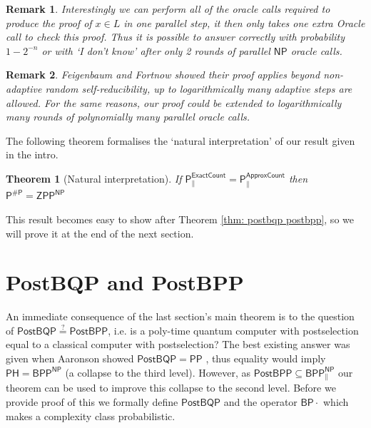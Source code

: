 \documentclass{article}
\newtheorem{theorem}{Theorem}
\newtheorem*{remark*}{Remark}
\begin{document}
\begin{remark*}
    Interestingly we can perform all of the oracle calls required to produce the proof of $x\in L$ in one parallel step, it then only takes one extra Oracle call to check this proof. Thus it is possible to answer correctly with probability $1-2^{-n}$ or with `I don't know' after only 2 rounds of parallel $\mathsf{NP}$ oracle calls.
\end{remark*}

\begin{remark*}
    Feigenbaum and Fortnow \cite{feigenbaum1990random} showed their proof applies beyond non-adaptive random self-reducibility, up to logarithmically many adaptive steps are allowed. For the same reasons, our proof could be extended to logarithmically many rounds of polynomially many parallel oracle calls.
\end{remark*}

The following theorem formalises the `natural interpretation' of our result given in the intro.

\begin{theorem}[Natural interpretation]\label{thm: natural}
    If $\mathsf{P^{ExactCount}_{\parallel}}=\mathsf{P^{ApproxCount}_{\parallel}}$ then $\mathsf{P^{\#P}=ZPP^{NP}}$
\end{theorem}

This result becomes easy to show after Theorem \ref{thm: postbqp postbpp}, so we will prove it at the end of the next section.



\section{PostBQP and PostBPP}\label{sect: postBQP v postBPP}

An immediate consequence of the last section's main theorem is to the question of $\mathsf{PostBQP\stackrel{?}{=} PostBPP}$, i.e. is a poly-time quantum computer with postselection equal to a classical computer with postselection? The best existing answer was given when Aaronson showed $\mathsf{PostBQP=PP}$ \cite{aaronson2014equivalence}, thus equality would imply $\mathsf{PH=BPP^{NP}}$ (a collapse to the third level). However, as $\mathsf{PostBPP}\subseteq \mathsf{BPP^{NP}_{\parallel}}$ \cite{o2018weakness, han1997threshold} our theorem can be used to improve this collapse to the second level. Before we provide proof of this we formally define $\mathsf{PostBQP}$ and the operator $\mathsf{BP\cdot}$ which makes a complexity class probabilistic.
\end{document}
